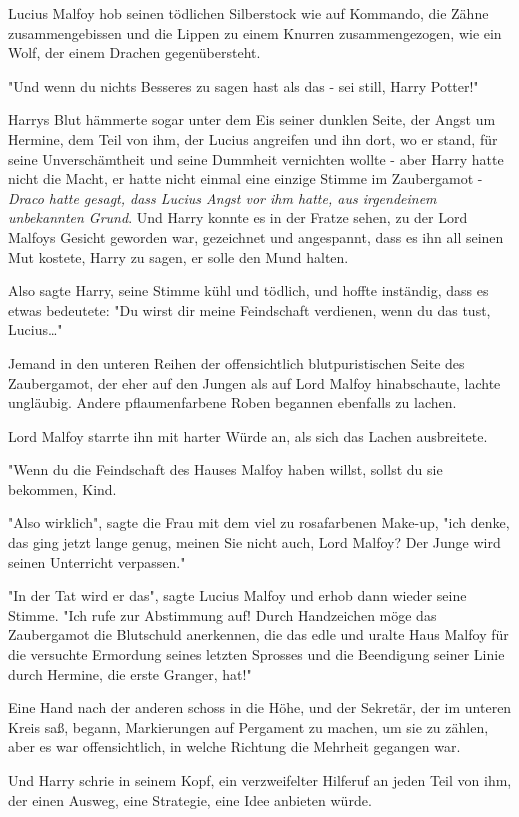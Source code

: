 {Lucius Malfoy hob seinen tödlichen Silberstock wie auf Kommando, die Zähne zusammengebissen und die Lippen zu einem Knurren zusammengezogen, wie ein Wolf, der einem Drachen gegenübersteht.

"Und wenn du nichts Besseres zu sagen hast als das - sei still, Harry Potter!"

Harrys Blut hämmerte sogar unter dem Eis seiner dunklen Seite, der Angst um Hermine, dem Teil von ihm, der Lucius angreifen und ihn dort, wo er stand, für seine Unverschämtheit und seine Dummheit vernichten wollte - aber Harry hatte nicht die Macht, er hatte nicht einmal eine einzige Stimme im Zaubergamot - \emph{Draco hatte gesagt, dass Lucius Angst vor ihm hatte, aus irgendeinem unbekannten Grund}. Und Harry konnte es in der Fratze sehen, zu der Lord Malfoys Gesicht geworden war, gezeichnet und angespannt, dass es ihn all seinen Mut kostete, Harry zu sagen, er solle den Mund halten.

Also sagte Harry, seine Stimme kühl und tödlich, und hoffte inständig, dass es etwas bedeutete: "Du wirst dir meine Feindschaft verdienen, wenn du das tust, Lucius…"

Jemand in den unteren Reihen der offensichtlich blutpuristischen Seite des Zaubergamot, der eher auf den Jungen als auf Lord Malfoy hinabschaute, lachte ungläubig. Andere pflaumenfarbene Roben begannen ebenfalls zu lachen.

Lord Malfoy starrte ihn mit harter Würde an, als sich das Lachen ausbreitete.

"Wenn du die Feindschaft des Hauses Malfoy haben willst, sollst du sie bekommen, Kind.

"Also wirklich", sagte die Frau mit dem viel zu rosafarbenen Make-up, "ich denke, das ging jetzt lange genug, meinen Sie nicht auch, Lord Malfoy? Der Junge wird seinen Unterricht verpassen."

"In der Tat wird er das", sagte Lucius Malfoy und erhob dann wieder seine Stimme. "Ich rufe zur Abstimmung auf! Durch Handzeichen möge das Zaubergamot die Blutschuld anerkennen, die das edle und uralte Haus Malfoy für die versuchte Ermordung seines letzten Sprosses und die Beendigung seiner Linie durch Hermine, die erste Granger, hat!"

Eine Hand nach der anderen schoss in die Höhe, und der Sekretär, der im unteren Kreis saß, begann, Markierungen auf Pergament zu machen, um sie zu zählen, aber es war offensichtlich, in welche Richtung die Mehrheit gegangen war.

Und Harry schrie in seinem Kopf, ein verzweifelter Hilferuf an jeden Teil von ihm, der einen Ausweg, eine Strategie, eine Idee anbieten würde.

}
